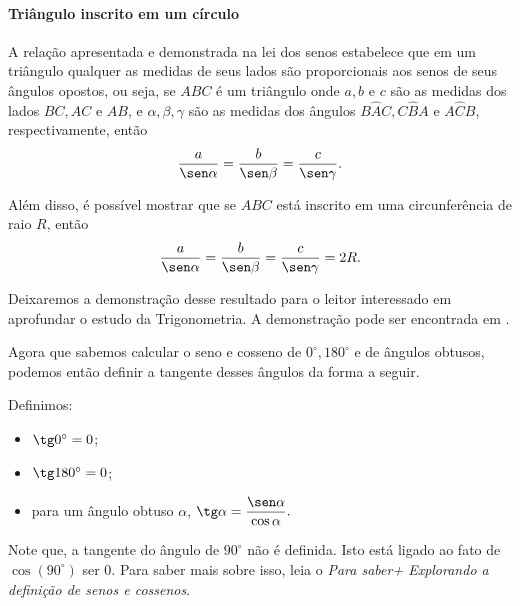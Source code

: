 \begin{knowledge} \label{sec2_parasabermais_trianguloinscrito}
\vspace{-1em}
\paragraph{Triângulo inscrito em um círculo}

A relação apresentada e demonstrada na lei dos senos estabelece que em um triângulo qualquer as medidas de seus lados são proporcionais aos senos de seus ângulos opostos, ou seja, se $ABC$ é um triângulo onde $a, b$ e $c$ são as medidas dos lados $BC, AC$ e $AB$, e $\alpha, \beta, \gamma$ são as medidas dos ângulos $B\hat{A}C,C\hat{B}A$ e $A\hat{C}B$, respectivamente, então
    $$\frac{a}{\sen\alpha} = \frac{b}{\sen\beta} = \frac{c}{\sen\gamma}.$$

Além disso, é possível mostrar que se $ABC$ está inscrito em uma circunferência de raio $R$, então 
$$\frac{a}{\sen\alpha} = \frac{b}{\sen\beta} = \frac{c}{\sen\gamma}=2R.$$

Deixaremos a demonstração desse resultado para o leitor interessado em aprofundar o estudo da Trigonometria. A demonstração pode ser encontrada em \cite{iezzi1993}.
\end{knowledge}


Agora que sabemos calcular o seno e cosseno de $0^\circ, 180^\circ$ e de ângulos obtusos, podemos então definir a tangente desses ângulos da forma a seguir.

\begin{description}\label{sec2_deftangente}
\item[Definição] Definimos:
\begin{itemize}
\item $\tg 0^\circ= 0$;
\item $\tg 180^\circ= 0$;
\item para um ângulo obtuso $\alpha$, $\tg\alpha=\dfrac{\sen\alpha}{\cos\alpha}.$
\end{itemize}
\end{description}

Note que, a tangente do ângulo de $90^\circ$ não é definida. Isto está ligado ao fato de $\cos(90^\circ)$ ser $0$. Para saber mais sobre isso, leia o \textit{Para saber+ Explorando a definição de senos e cossenos}.

